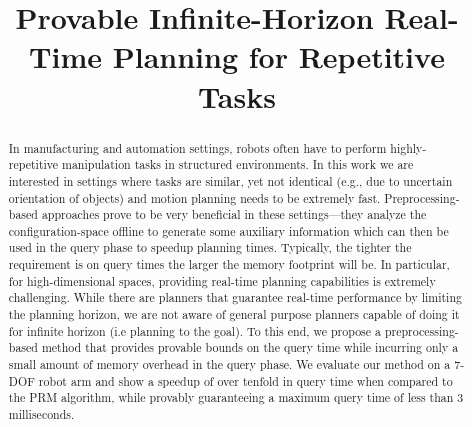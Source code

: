 \documentclass[letterpaper]{article} %
\begin{document}
%
\title{Provable Infinite-Horizon Real-Time Planning for Repetitive Tasks}
\maketitle

\begin{abstract}
In manufacturing and automation settings, robots often have to perform highly-repetitive manipulation tasks in structured environments. 
In this work we are interested in settings where tasks are similar, yet not identical (e.g., due to uncertain orientation of objects) and motion planning needs to be extremely fast. 
Preprocessing-based approaches prove to be very beneficial in these settings---they analyze the configuration-space offline to generate some auxiliary information which can then be used in the query phase to speedup planning times. 
%
Typically, the tighter the requirement is on query times the larger the memory footprint will be. In particular, for high-dimensional spaces, providing real-time planning capabilities is extremely challenging.
While there are planners that guarantee real-time performance by limiting the planning horizon, we are not aware of general purpose planners capable of doing it for infinite horizon (i.e planning to the goal).
%
To this end, we propose a preprocessing-based method that provides provable bounds on the query time while incurring only a small amount of memory overhead in the query phase.
We evaluate our method on a 7-DOF robot arm and show a speedup of over tenfold in query time when compared to the \textsf{PRM} algorithm, while provably guaranteeing a maximum query time of less than 3 milliseconds.
\end{abstract}
\end{document}
